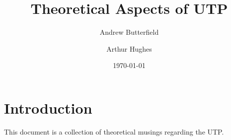 \documentclass[fleqn,10pt]{article}
\author{%
  Andrew Butterfield%
  \and
  Arthur Hughes
}
\title{Theoretical Aspects of UTP}
\date\today
\begin{document}


\maketitle
\tableofcontents

\section{Introduction}

This document is a collection of theoretical musings regarding the UTP.

\newpage


\newpage

\end{document}
